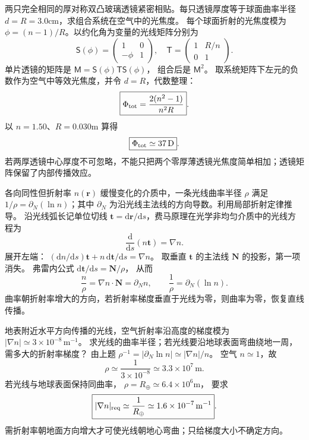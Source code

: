 两只完全相同的厚对称双凸玻璃透镜紧密相贴。每只透镜厚度等于球面曲率半径 $d=R=3.0$cm，求组合系统在空气中的光焦度。
\exsolution
每个球面折射的光焦度模为
$\phi=(n-1)/R$。以约化角为变量的光线矩阵分别为
\[
\mathsf S(\phi)=\begin{pmatrix}1&0\\-\phi&1\end{pmatrix},\quad
\mathsf T=\begin{pmatrix}1&R/n\\0&1\end{pmatrix}.
\]
单片透镜的矩阵是
$\mathsf M=\mathsf S(\phi)\mathsf T\mathsf S(\phi)$，
组合后是 $\mathsf M^2$。
取系统矩阵下左元的负数作为空气中等效光焦度，并令 $d=R$，代数整理：
\[
\boxed{\Phi_{\rm tot}=\frac{2(n^2-1)}{n^2R}}.
\]
以 $n=1.50$、$R=0.030$m 算得
\[
\boxed{\Phi_{\rm tot}\simeq37\,\mathrm D}.
\]
\excheck 若两厚透镜中心厚度不可忽略，不能只把两个零厚薄透镜光焦度简单相加；透镜矩阵保留了内部传播效应。

各向同性但折射率 $n(\bm r)$ 缓慢变化的介质中，一条光线曲率半径 $\rho$ 满足
$1/\rho=\partial_N(\ln n)$；其中 $\partial_N$ 为沿光线主法线的方向导数。利用局部折射定律推导。
\exsolution
沿光线弧长记单位切线 $\bm t=\mathrm d\bm r/\mathrm ds$，费马原理在光学非均匀介质中的光线方程为
\[
\frac{\mathrm d}{\mathrm ds}(n\bm t)=\nabla n.
\]
展开左端：
$(\mathrm dn/\mathrm ds)\bm t+
n\,\mathrm d\bm t/\mathrm ds=\nabla n$。
取垂直 $\bm t$ 的主法线 $\bm N$ 的投影，第一项消失。
弗雷内公式 $\mathrm d\bm t/\mathrm ds=\bm N/\rho$，
从而
\[
\frac n\rho=\nabla n\cdot\bm N=\partial_N n,
\qquad
\boxed{\frac1\rho=\partial_N(\ln n)}.
\]
\excheck 曲率朝折射率增大的方向，若折射率梯度垂直于光线为零，则曲率为零，恢复直线传播。

地表附近水平方向传播的光线，空气折射率沿高度的梯度模为
$|\nabla n|\simeq3\times10^{-8}\,\mathrm{m^{-1}}$。
求光线的曲率半径；若光线要沿地球表面弯曲绕地一周，需多大的折射率梯度？
\exsolution
由上题
$\rho^{-1}=|\partial_N\ln n|\simeq|\nabla n|/n$。
空气 $n\simeq1$，故
\[
\boxed{\rho\simeq\frac1{3\times10^{-8}}
\simeq3.3\times10^7\,\mathrm m}.
\]
若光线与地球表面保持同曲率，
$\rho=R_\oplus\simeq6.4\times10^6$m，
要求
\[
\boxed{|\nabla n|_{\rm req}\simeq
\frac1{R_\oplus}\simeq1.6\times10^{-7}\,\mathrm{m^{-1}}}.
\]
\excheck 需折射率朝地面方向增大才可使光线朝地心弯曲；只给梯度大小不确定方向。
